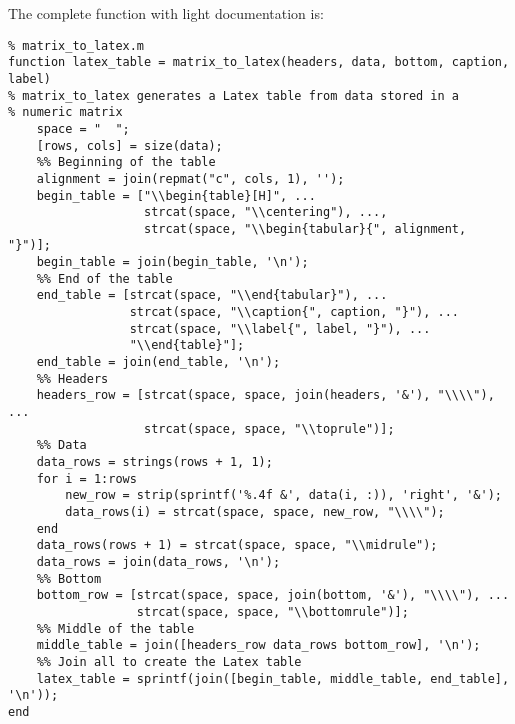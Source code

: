 \documentclass[12pt, a4paper]{article}
\begin{document}
The complete function with light documentation is:
\lstset{language=matlab,label= ,caption= ,captionpos=b,firstnumber=1,numbers=left,style=Matlab-editor}
\begin{lstlisting}
% matrix_to_latex.m
function latex_table = matrix_to_latex(headers, data, bottom, caption, label)
% matrix_to_latex generates a Latex table from data stored in a
% numeric matrix
    space = "  ";
    [rows, cols] = size(data);
    %% Beginning of the table
    alignment = join(repmat("c", cols, 1), '');
    begin_table = ["\\begin{table}[H]", ...
                   strcat(space, "\\centering"), ...,
                   strcat(space, "\\begin{tabular}{", alignment, "}")];
    begin_table = join(begin_table, '\n');
    %% End of the table
    end_table = [strcat(space, "\\end{tabular}"), ...
                 strcat(space, "\\caption{", caption, "}"), ...
                 strcat(space, "\\label{", label, "}"), ...
                 "\\end{table}"];
    end_table = join(end_table, '\n');
    %% Headers
    headers_row = [strcat(space, space, join(headers, '&'), "\\\\"), ...
                   strcat(space, space, "\\toprule")];
    %% Data
    data_rows = strings(rows + 1, 1);
    for i = 1:rows
        new_row = strip(sprintf('%.4f &', data(i, :)), 'right', '&');
        data_rows(i) = strcat(space, space, new_row, "\\\\");
    end
    data_rows(rows + 1) = strcat(space, space, "\\midrule");
    data_rows = join(data_rows, '\n');
    %% Bottom
    bottom_row = [strcat(space, space, join(bottom, '&'), "\\\\"), ...
                  strcat(space, space, "\\bottomrule")];
    %% Middle of the table
    middle_table = join([headers_row data_rows bottom_row], '\n');
    %% Join all to create the Latex table
    latex_table = sprintf(join([begin_table, middle_table, end_table], '\n'));
end
\end{lstlisting}
\end{document}
